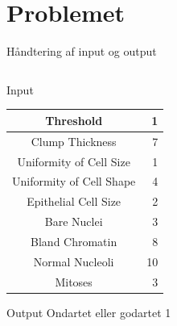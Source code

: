 \documentclass[12pt,t]{beamer}
\begin{document}
\section{Problemet}
\frame{\tableofcontents[currentsection]}
    \begin{frame}[c]{Håndtering af input og output}
        \begin{columns}
            \begin{column}{0.6\textwidth}
                \begin{block}{Input}
                    \begin{center}
                        \begin{tabular}{ c  r }
                            \toprule
                            Threshold                & 1           \\\midrule
                            Clump Thickness          & 7           \\ \midrule
                            Uniformity of Cell Size  & 1           \\ \midrule
                            Uniformity of Cell Shape & 4           \\ \midrule
                            Epithelial Cell Size     & 2           \\ \midrule
                            Bare Nuclei              & 3           \\ \midrule
                            Bland Chromatin          & 8           \\ \midrule
                            Normal Nucleoli          & 10          \\ \midrule
                            Mitoses                  & 3           \\ \bottomrule
                        \end{tabular}
                    \end{center}
                \end{block}
                \vspace{-1em}
                \begin{block}{Output}
                    \centering Ondartet eller godartet
                    {\color{KUNATgreen}1}
                \end{block}
            \end{column}
            \pause


\end{columns}
\end{frame}
\end{document}
